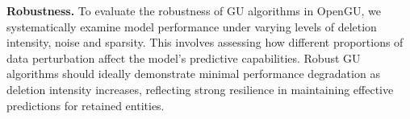  \textbf{Robustness.}
To evaluate the robustness of GU algorithms in OpenGU, we systematically examine model performance under varying levels of deletion intensity, noise and sparsity. This involves assessing how different proportions of data perturbation affect the model’s predictive capabilities. Robust GU algorithms should ideally demonstrate minimal performance degradation as deletion intensity increases, reflecting strong resilience in maintaining effective predictions for retained entities.






